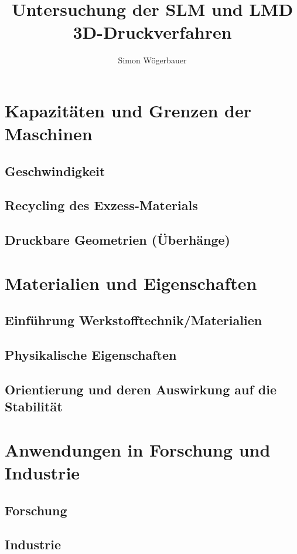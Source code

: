 \documentclass[12pt]{article}
\title{Untersuchung der SLM und LMD 3D-Druckverfahren}
\author{Simon Wögerbauer}
\begin{document}

%
\pagebreak
\pagebreak
{}
\tableofcontents
\pagebreak



\section{Kapazitäten und Grenzen der Maschinen}
\subsection{Geschwindigkeit}
\subsection{Recycling des Exzess-Materials}
\subsection{Druckbare Geometrien (Überhänge)}
\section{Materialien und Eigenschaften}
\subsection{Einführung Werkstofftechnik/Materialien}
\subsection{Physikalische Eigenschaften}
\subsection{Orientierung und deren Auswirkung auf die Stabilität}
\section{Anwendungen in Forschung und Industrie}
\subsection{Forschung}
\subsection{Industrie}
\end{document}
